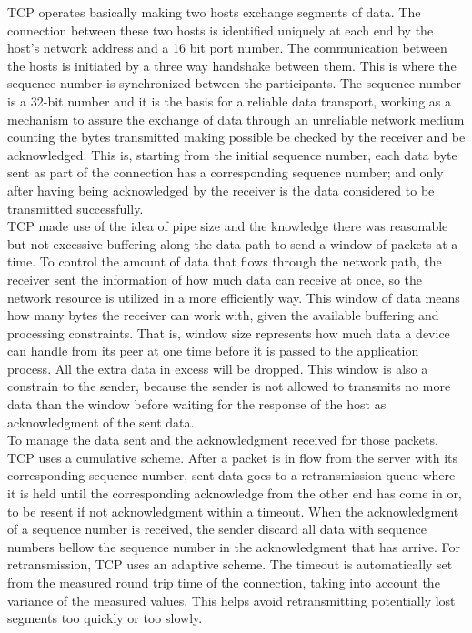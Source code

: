 TCP operates basically making two hosts exchange segments of data. The
connection between these two hosts is identified uniquely at each end by the
host's network address and a 16 bit port number. The communication between the
hosts is initiated by a three way handshake between them. This is where the
sequence number is synchronized between the participants. The sequence number
is a 32-bit number and it is the basis for a reliable data transport, working as
a mechanism to assure the exchange of data through an unreliable network
medium counting the bytes transmitted making possible be checked by the
receiver and be acknowledged. This is, starting from the initial sequence
number, each data byte sent as part of the connection has a corresponding
sequence number; and only after having being acknowledged by the receiver is
the data considered to be transmitted successfully.\\

TCP made use of the idea of pipe size and the knowledge there was reasonable
but not excessive buffering along the data path to send a window of packets at
a time. To control the amount of data that flows through the network path, the
receiver sent the information of how much data can receive at once, so the
network resource is utilized in a more efficiently way. This window of data
means how many bytes the receiver can work with, given the available buffering
and processing constraints. That is, window size represents how much data a
device can handle from its peer at one time before it is passed to the
application process. All the extra data in excess will be dropped. This window
is also a constrain to the sender, because the sender is not allowed to
transmits no more data than the window before waiting for the response of the
host as acknowledgment of the sent data.\\

To manage the data sent and the acknowledgment received for those packets, TCP
uses a cumulative scheme. After a packet is in flow from the server with its
corresponding sequence number, sent data goes to a retransmission queue where
it is held until the corresponding acknowledge from the other end has come in
or, to be resent if not acknowledgment within a timeout. When the
acknowledgment of a sequence number is received, the sender discard all data
with sequence numbers bellow the sequence number in the acknowledgment that
has arrive. For retransmission, TCP uses an adaptive scheme. The timeout is
automatically set from the measured round trip time of the connection,
taking into account the variance of the measured values\cite{JacobsonCAC}.
This helps avoid retransmitting potentially lost segments too quickly or too
slowly.\\

